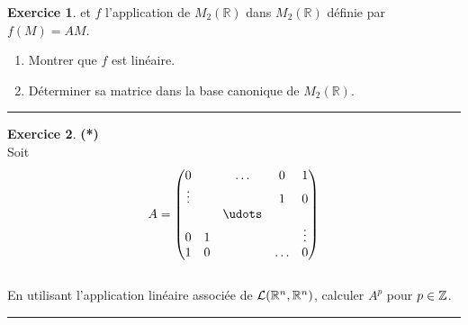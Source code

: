\documentclass[a4paper,11pt]{article}
\theoremstyle{definition}
\newtheorem{exo}{Exercice} %
\begin{document}
\begin{minipage}{1\linewidth}
\begin{minipage}[t]{0.48\linewidth}
\begin{exo}
et $f$ l'application de $M_2(\mathbb R)$ dans $M_2(\mathbb R)$
définie par $f(M)=AM$.
\begin{enumerate}
	\item Montrer que $f$ est linéaire.
	\item Déterminer sa matrice dans la base canonique de $M_2(\mathbb R)$.
\end{enumerate}

\centering\rule{1\linewidth}{0.6pt}\end{exo}


\begin{exo}\textbf{(*)}\quad\\[0.2cm]
Soit $$A = \begin{pmatrix} 
0&&\dots&0&1 \\ 
\vdots&&&1&0 \\
& & \udots && \\
0&1& & &\vdots \\ 
1&0&&\dots&0
\end{pmatrix}$$ \quad \\[0.2cm]


En utilisant l'application linéaire associée de 
$\mathcal{L} (\mathbb{R}^n,\mathbb{R}^n)$, calculer $A^p$ pour $p \in \mathbb{Z}$.

\centering\rule{1\linewidth}{0.6pt}\end{exo}


\end{minipage}\end{minipage} \newpage
\end{document}

